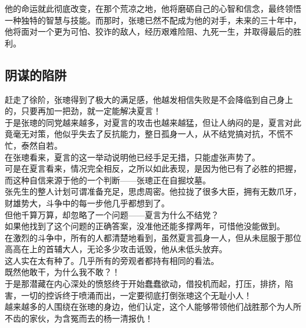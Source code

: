 \begin{multicols}{\theparacolNo}
他的命运就此彻底改变，在那个荒凉之地，他将磨砺自己的心智和信念，最终领悟一种独特的智慧与技能。而那时，张璁已然不配成为他的对手，未来的三十年中，他将面对一个更为可怕、狡诈的敌人，经历艰难险阻、九死一生，并取得最后的胜利。\\

\subsection{阴谋的陷阱}
赶走了徐阶，张璁得到了极大的满足感，他越发相信失败是不会降临到自己身上的，只要再加一把劲，就一定能解决夏言！\\

于是张璁的同党越来越多，对夏言的攻击也越来越猛，但让人纳闷的是，夏言对此竟毫无对策，他似乎失去了反抗能力，整日孤身一人，从不结党搞对抗，不慌不忙，泰然自若。\\

在张璁看来，夏言的这一举动说明他已经手足无措，只能虚张声势了。\\

可是在夏言看来，情况完全相反，之所以如此表现，是因为他已有了必胜的把握，而这种自信来源于他的一个判断——张璁正在自掘坟墓。\\

张先生的整人计划可谓准备充足，思虑周密。他拉拢了很多大臣，拥有无数爪牙，财雄势大，斗争中的每一步他几乎都想到了。\\

但他千算万算，却忽略了一个问题——夏言为什么不结党？\\

如果他找到了这个问题的正确答案，没准他还能多撑两年，可惜他没能做到。\\

在激烈的斗争中，所有的人都清楚地看到，虽然夏言孤身一人，但从未屈服于那位高高在上的首辅大人，无论多少攻击诋毁，他从未低头放弃。\\

这人实在太有种了。几乎所有的旁观者都持有相同的看法。\\

既然他敢干，为什么我不敢？！\\

于是那潜藏在内心深处的愤怒终于开始蠢蠢欲动，借投机而起，打压，排挤，陷害，一切的控诉终于喷涌而出，一定要彻底打倒张璁这个无耻小人！\\

越来越多的人围绕在张璁的身边，他们认定，这个人能够带领他们战胜那个为人所不齿的家伙，为含冤而去的杨一清报仇！\\


\end{multicols}
